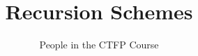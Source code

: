 \documentclass{article}
\begin{document}
\title{Recursion Schemes}
\author{People in the CTFP Course}
\maketitle
\tableofcontents






\end{document}
